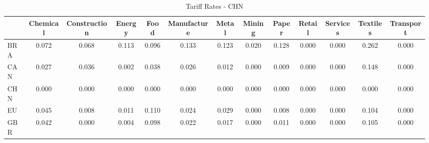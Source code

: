 \begin{table}[htbp]
\centering
\caption{Tariff Rates - CHN} 
\label{tab:tariffs_CHN}
\begin{tabular}{lcccccccccccc}
  \hline
 & Chemical & Construction & Energy & Food & Manufacture & Metal & Mining & Paper & Retail & Services & Textiles & Transport \\ 
  \hline
BRA & \textcolor[RGB]{59,38,196}{0.072} & \textcolor[RGB]{66,43,189}{0.068} & \textcolor[RGB]{28,18,227}{0.113} & \textcolor[RGB]{42,27,212}{0.096} & \textcolor[RGB]{17,11,238}{0.133} & \textcolor[RGB]{25,16,230}{0.123} & \textcolor[RGB]{117,76,138}{0.020} & \textcolor[RGB]{21,14,234}{0.128} & \textcolor[RGB]{255,165,0}{0.000} & \textcolor[RGB]{255,165,0}{0.000} & \textcolor[RGB]{2,1,253}{0.262} & \textcolor[RGB]{255,165,0}{0.000} \\ 
  CAN & \textcolor[RGB]{104,67,151}{0.027} & \textcolor[RGB]{91,59,164}{0.036} & \textcolor[RGB]{151,98,104}{0.002} & \textcolor[RGB]{87,56,168}{0.038} & \textcolor[RGB]{106,69,149}{0.026} & \textcolor[RGB]{132,85,123}{0.012} & \textcolor[RGB]{255,165,0}{0.000} & \textcolor[RGB]{138,89,117}{0.009} & \textcolor[RGB]{255,165,0}{0.000} & \textcolor[RGB]{255,165,0}{0.000} & \textcolor[RGB]{13,8,242}{0.148} & \textcolor[RGB]{255,165,0}{0.000} \\ 
  CHN & \textcolor[RGB]{255,165,0}{0.000} & \textcolor[RGB]{255,165,0}{0.000} & \textcolor[RGB]{255,165,0}{0.000} & \textcolor[RGB]{255,165,0}{0.000} & \textcolor[RGB]{255,165,0}{0.000} & \textcolor[RGB]{255,165,0}{0.000} & \textcolor[RGB]{255,165,0}{0.000} & \textcolor[RGB]{255,165,0}{0.000} & \textcolor[RGB]{255,165,0}{0.000} & \textcolor[RGB]{255,165,0}{0.000} & \textcolor[RGB]{255,165,0}{0.000} & \textcolor[RGB]{255,165,0}{0.000} \\ 
  EU & \textcolor[RGB]{79,51,176}{0.045} & \textcolor[RGB]{140,91,115}{0.008} & \textcolor[RGB]{134,87,121}{0.011} & \textcolor[RGB]{30,19,225}{0.110} & \textcolor[RGB]{110,72,144}{0.024} & \textcolor[RGB]{102,66,153}{0.029} & \textcolor[RGB]{255,165,0}{0.000} & \textcolor[RGB]{142,92,113}{0.008} & \textcolor[RGB]{255,165,0}{0.000} & \textcolor[RGB]{255,165,0}{0.000} & \textcolor[RGB]{36,23,219}{0.104} & \textcolor[RGB]{255,165,0}{0.000} \\ 
  GBR & \textcolor[RGB]{83,54,172}{0.042} & \textcolor[RGB]{157,102,98}{0.000} & \textcolor[RGB]{149,96,106}{0.004} & \textcolor[RGB]{40,26,215}{0.098} & \textcolor[RGB]{113,73,142}{0.022} & \textcolor[RGB]{121,78,134}{0.017} & \textcolor[RGB]{255,165,0}{0.000} & \textcolor[RGB]{136,88,119}{0.011} & \textcolor[RGB]{255,165,0}{0.000} & \textcolor[RGB]{255,165,0}{0.000} & \textcolor[RGB]{34,22,221}{0.105} & \textcolor[RGB]{255,165,0}{0.000} \\ 

\end{tabular}
\end{table}
